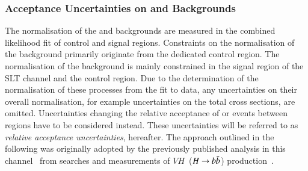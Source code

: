\subsubsection{Acceptance Uncertainties on \ZHF and \ttbar Backgrounds}

The normalisation of the \ZHF and \ttbar backgrounds are measured in
the combined likelihood fit of control and signal regions. Constraints
on the normalisation of the \ZHF background primarily originate from
the dedicated control region. The normalisation of the \ttbar
background is mainly constrained in the signal region of the \lephad
SLT channel and the \ZHF control region. Due to the determination of
the normalisation of these processes from the fit to data, any
uncertainties on their overall normalisation, for example
uncertainties on the total cross sections, are omitted. Uncertainties
changing the relative acceptance of \ZHF or \ttbar events between
regions have to be considered instead. These uncertainties will be
referred to as \emph{relative acceptance uncertainties},
hereafter. The approach outlined in the following was originally
adopted by the previously published analysis in this
channel~\cite{HIGG-2016-16-witherratum} from searches and measurements
of $VH$~($H\to b\bar{b}$)
production~\cite{HIGG-2016-29,HIGG-2018-04,HIGG-2018-51}.

